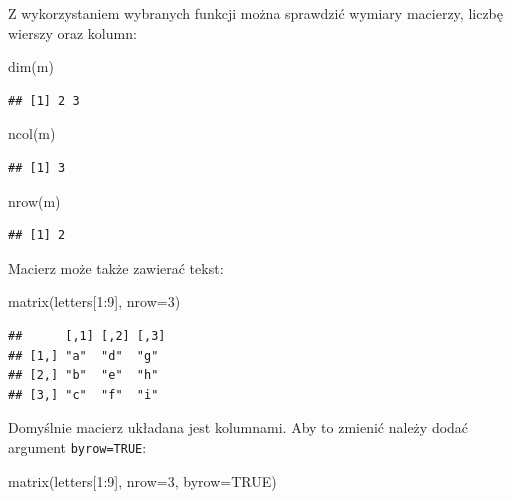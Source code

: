 \documentclass[
]{book}
\newenvironment{Shaded}{\begin{snugshade}}{\end{snugshade}}
\newcommand{\AttributeTok}[1]{\textcolor[rgb]{0.77,0.63,0.00}{#1}}
\newcommand{\ConstantTok}[1]{\textcolor[rgb]{0.00,0.00,0.00}{#1}}
\newcommand{\DecValTok}[1]{\textcolor[rgb]{0.00,0.00,0.81}{#1}}
\newcommand{\FunctionTok}[1]{\textcolor[rgb]{0.00,0.00,0.00}{#1}}
\newcommand{\NormalTok}[1]{#1}
\newcommand{\SpecialCharTok}[1]{\textcolor[rgb]{0.00,0.00,0.00}{#1}}
\begin{document}
Z wykorzystaniem wybranych funkcji można sprawdzić wymiary macierzy, liczbę wierszy oraz kolumn:

\begin{Shaded}
\begin{Highlighting}[]
\FunctionTok{dim}\NormalTok{(m)}
\end{Highlighting}
\end{Shaded}

\begin{verbatim}
## [1] 2 3
\end{verbatim}

\begin{Shaded}
\begin{Highlighting}[]
\FunctionTok{ncol}\NormalTok{(m)}
\end{Highlighting}
\end{Shaded}

\begin{verbatim}
## [1] 3
\end{verbatim}

\begin{Shaded}
\begin{Highlighting}[]
\FunctionTok{nrow}\NormalTok{(m)}
\end{Highlighting}
\end{Shaded}

\begin{verbatim}
## [1] 2
\end{verbatim}

Macierz może także zawierać tekst:

\begin{Shaded}
\begin{Highlighting}[]
\FunctionTok{matrix}\NormalTok{(letters[}\DecValTok{1}\SpecialCharTok{:}\DecValTok{9}\NormalTok{], }\AttributeTok{nrow=}\DecValTok{3}\NormalTok{)}
\end{Highlighting}
\end{Shaded}

\begin{verbatim}
##      [,1] [,2] [,3]
## [1,] "a"  "d"  "g" 
## [2,] "b"  "e"  "h" 
## [3,] "c"  "f"  "i"
\end{verbatim}

Domyślnie macierz układana jest kolumnami. Aby to zmienić należy dodać argument \texttt{byrow=TRUE}:

\begin{Shaded}
\begin{Highlighting}[]
\FunctionTok{matrix}\NormalTok{(letters[}\DecValTok{1}\SpecialCharTok{:}\DecValTok{9}\NormalTok{], }\AttributeTok{nrow=}\DecValTok{3}\NormalTok{, }\AttributeTok{byrow=}\ConstantTok{TRUE}\NormalTok{)}
\end{Highlighting}
\end{Shaded}
\end{document}
